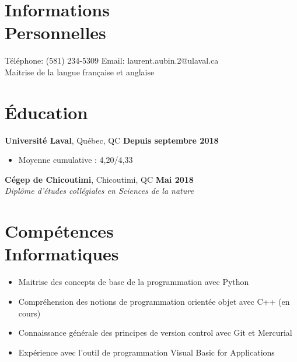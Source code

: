 \documentclass[margin,line]{resume}
\begin{document}
\begin{resume}
    \section{\mysidestyle Informations\\Personnelles}

    T\'{e}l\'{e}phone: (581) 234-5309     \hfill \noindent Email: laurent.aubin.2@ulaval.ca \\
    Maitrise de la langue fran\c{c}aise et anglaise


    \section{\mysidestyle \'{E}ducation}

    \textbf{Universit\'{e} Laval}, Qu\'{e}bec, QC \hfill \textbf{Depuis septembre 2018} \vspace{2mm}\\\vspace{1mm}%
    \begin{itemize}[nosep]
        \item Moyenne cumulative : 4,20/4,33
    \end{itemize}

      \textbf{C\'{e}gep de Chicoutimi}, Chicoutimi, QC \hfill \textbf{Mai 2018} \vspace{2mm}\\\vspace{1mm}%
    \textsl{Dipl\^{o}me d'\'{e}tudes coll\'{e}giales en Sciences de la nature}


    \section{\mysidestyle Comp\'{e}tences\\Informatiques}
     \begin{itemize}[nosep]
        \item Maitrise des concepts de base de la programmation avec Python
        \item Compr\'{e}hension des notions de programmation orient\'{e}e objet avec C++ (en cours)
         \item Connaissance g\'{e}n\'{e}rale des principes de version control avec Git et Mercurial
        \item Exp\'{e}rience avec l'outil de programmation Visual Basic for Applications
    \end{itemize}


\end{resume}
\end{document}
